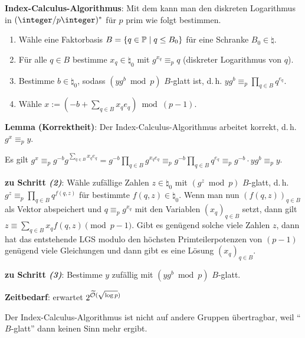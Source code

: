 \textbf{Index-Calculus-Algorithmus}:
Mit dem  kann man den diskreten Logarithmus
in $(\ZpZ)^\ast$ für $p$ prim wie folgt bestimmen.
\begin{enumerate}
    \item
    Wähle eine Faktorbasis $B = \{q \in \mathbb{P} \;|\; q \le B_0\}$ für eine Schranke
    $B_0 \in \natural$.
    
    \item
    Für alle $q \in B$ bestimme $x_q \in \natural_0$ mit $g^{x_q} \equiv_p q$
    (diskreter Logarithmus von $q$).
    
    \item
    Bestimme $b \in \natural_0$, sodass $(yg^b \bmod p)$ $B$-glatt ist,
    d.\,h. $yg^b \equiv_p \prod_{q \in B} q^{e_q}$.
    
    \item
    Wähle $x := (-b + \sum_{q \in B} x_q e_q) \bmod (p-1)$.
\end{enumerate}

\textbf{Lemma (Korrektheit)}:
Der Index-Calculus-Algorithmus arbeitet korrekt, d.\,h. $g^x \equiv_p y$.

\begin{Beweis}
    Es gilt $g^x \equiv_p g^{-b} g^{\sum_{q \in B} x_q e_q}
    = g^{-b} \prod_{q \in B} g^{x_q e_q}
    \equiv_p g^{-b} \prod_{q \in B} q^{e_q}
    \equiv_p g^{-b} \cdot yg^b \equiv_p y$.
\end{Beweis}

\linie

\textbf{zu Schritt \emph{(2)}}:
Wähle zufällige Zahlen $z \in \natural_0$ mit $(g^z \bmod p)$ $B$-glatt,
d.\,h. $g^z \equiv_p \prod_{q \in B} q^{f(q,z)}$ für bestimmte $f(q,z) \in \natural_0$.
Wenn man nun $(f(q,z))_{q \in B}$ als Vektor abspeichert
und $q \equiv_p g^{x_q}$ mit den Variablen $(x_q)_{q \in B}$ setzt,
dann gilt $z \equiv \sum_{q \in B} x_q f(q, z) \pmod{p - 1}$.
Gibt es genügend solche viele Zahlen $z$, dann hat das entstehende LGS modulo den höchsten
Primteilerpotenzen von $(p-1)$ genügend viele Gleichungen und dann gibt es eine Lösung
$(x_q)_{q \in B}$.

\textbf{zu Schritt \emph{(3)}}:
Bestimme $y$ zufällig mit $(yg^b \bmod p)$ $B$-glatt.

\linie

\textbf{Zeitbedarf}:
erwartet $2^{\widetilde{\mathcal{O}}(\sqrt{\log p})}$

\linie

Der Index-Calculus-Algorithmus ist nicht auf andere Gruppen übertragbar, weil
"`$B$-glatt"' dann keinen Sinn mehr ergibt.

\pagebreak
